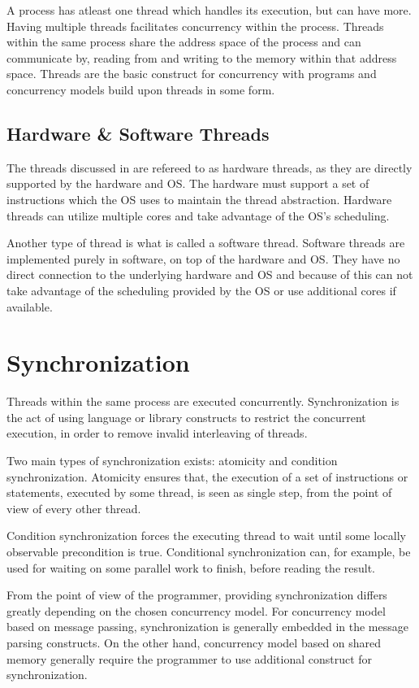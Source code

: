 A process has atleast one thread which handles its execution, but can have more. Having multiple threads facilitates concurrency within the process. Threads within the same process share the address space of the process and can communicate by, reading from and writing to the memory within that address space. Threads are the basic construct for concurrency with programs and concurrency models build upon threads in some form.


\subsection{Hardware \& Software Threads}
The threads discussed in  are refereed to as hardware threads, as they are directly supported by the hardware and \ac{OS}. The hardware must support a set of instructions which the \ac{OS} uses to maintain the thread abstraction. Hardware threads can utilize multiple cores and take advantage of the \ac{OS}'s scheduling.

Another type of thread is what is called a software thread. Software threads are implemented purely in software, on top of the hardware and \ac{OS}. They have no direct connection to the underlying hardware and \ac{OS} and because of this can not take advantage of the scheduling provided by the \ac{OS} or use additional cores if available. 

\section{Synchronization}\label{sec:synchronization}
Threads within the same process are executed concurrently. Synchronization is the act of using language or library constructs to restrict the concurrent execution, in order to remove invalid interleaving of threads\cite[p. 1989]{scott2011sync}.

Two main types of synchronization exists: atomicity and condition synchronization. Atomicity ensures that, the execution of a set of instructions or statements, executed by some thread, is seen as single step, from the point of view of every other thread\cite[p. 1989]{scott2011sync}.

Condition synchronization forces the executing thread to wait until some locally observable precondition is true\cite[p. 1989]{scott2011sync}. Conditional synchronization can, for example, be used for waiting on some parallel work to finish, before reading the result.

From the point of view of the programmer, providing synchronization differs greatly depending on the chosen concurrency model. For concurrency model based on message passing, synchronization is generally embedded in the message parsing constructs. On the other hand, concurrency model based on shared memory generally require the programmer to use additional construct for synchronization\cite[p. 1989]{scott2011sync}.

\worksheetend
